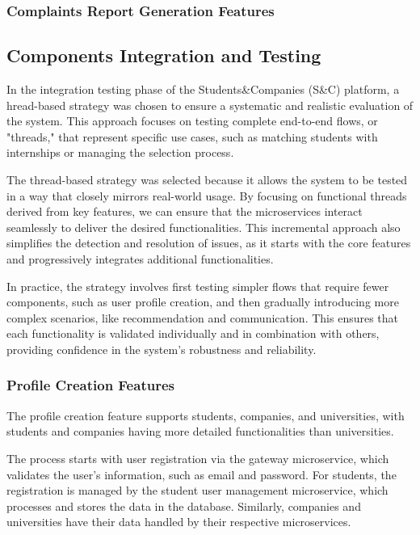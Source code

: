 \subsubsection{Complaints Report Generation Features}

\subsection{Components Integration and Testing}

In the integration testing phase of the Students\&Companies (S\&C) platform, a hread-based strategy
was chosen to ensure a systematic and realistic evaluation of the system. This approach focuses on
testing complete end-to-end flows, or "threads," that represent specific use cases, such as matching
students with internships or managing the selection process. 

The thread-based strategy was selected because it allows the system to be tested in a way that
closely mirrors real-world usage. By focusing on functional threads derived from key features,
we can ensure that the microservices interact seamlessly to deliver the desired functionalities.
This incremental approach also simplifies the detection and resolution of issues, as it starts
with the core features and progressively integrates additional functionalities.

In practice, the strategy involves first testing simpler flows that require fewer components,
such as user profile creation, and then gradually introducing more complex scenarios,
like recommendation and communication. This ensures that each functionality is validated
individually and in combination with others, providing confidence in the system’s robustness
and reliability.

\subsubsection{Profile Creation Features}

The profile creation feature supports students, companies, and universities, with students
and companies having more detailed functionalities than universities.

The process starts with user registration via the gateway microservice, which validates the
user’s information, such as email and password. For students, the registration is managed by
the student user management microservice, which processes and stores the data in the database.
Similarly, companies and universities have their data handled by their respective microservices.

